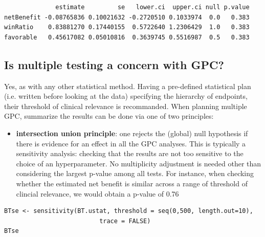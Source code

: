 \documentclass[12pt]{article}
\begin{document}
\begin{verbatim}
              estimate         se   lower.ci  upper.ci null p.value
netBenefit -0.08765836 0.10021632 -0.2720510 0.1033974  0.0   0.383
winRatio    0.83881270 0.17440155  0.5722640 1.2306429  1.0   0.383
favorable   0.45617082 0.05010816  0.3639745 0.5516987  0.5   0.383
\end{verbatim}


\clearpage

\subsection{Is multiple testing a concern with GPC?}
\label{sec:orga48147c}

Yes, as with any other statistical method. Having a pre-defined
statistical plan (i.e. written before looking at the data) specifying
the hierarchy of endpoints, their threshold of clinical relevance is
recommanded. When planning multiple GPC, summarize the results can be
done via one of two principles:
\begin{itemize}
\item \textbf{intersection union principle}: one rejects the (global) null
hypothesis if there is evidence for an effect in all the GPC
analyses. This is typically a sensitivity analysis: checking that
the results are not too sensitive to the choice of an
hyperparameter. No multiplicity adjustment is needed other than
considering the largest p-value among all tests. For instance, when
checking whether the estimated net benefit is similar across a range
of threshold of clincial relevance, we would obtain a p-value of
0.76
\end{itemize}
\lstset{language=r,label= ,caption= ,captionpos=b,numbers=none}
\begin{lstlisting}
BTse <- sensitivity(BT.ustat, threshold = seq(0,500, length.out=10),
                          trace = FALSE)
BTse
\end{lstlisting}
\end{document}
